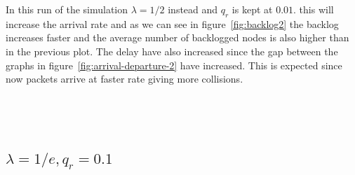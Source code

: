 \documentclass{article}
\begin{document}
In this run of the simulation $\lambda=1/2$ instead and $q_r$ is kept at $0.01$. this will increase the arrival rate and as we can see in figure~\ref{fig:backlog2} the backlog increases faster and the average number of backlogged nodes is also higher than in the previous plot. The delay have also increased since the gap between the graphs in figure~\ref{fig:arrival-departure-2} have increased. This is expected since now packets arrive at faster rate giving more collisions.\\\\\\\\

\subsection{$\lambda = 1/e, q_r = 0.1$}
\end{document}

